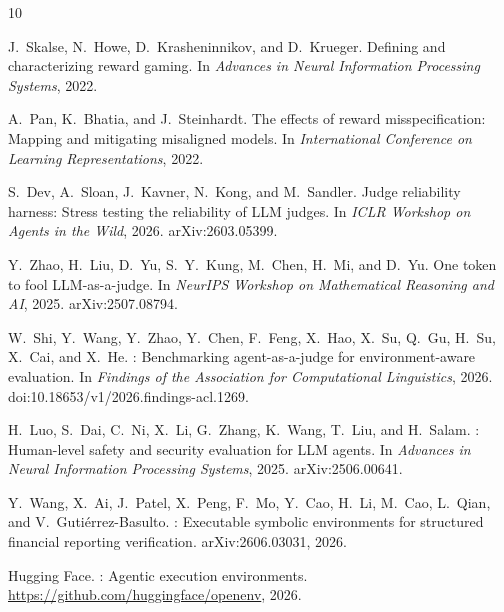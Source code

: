 \documentclass{article}
\begin{document}
{\small
\begin{thebibliography}{10}

J.~Skalse, N.~Howe, D.~Krasheninnikov, and D.~Krueger.
\newblock Defining and characterizing reward gaming.
\newblock In \emph{Advances in Neural Information Processing Systems}, 2022.

A.~Pan, K.~Bhatia, and J.~Steinhardt.
\newblock The effects of reward misspecification: Mapping and mitigating misaligned models.
\newblock In \emph{International Conference on Learning Representations}, 2022.

S.~Dev, A.~Sloan, J.~Kavner, N.~Kong, and M.~Sandler.
\newblock Judge reliability harness: Stress testing the reliability of {LLM} judges.
\newblock In \emph{{ICLR} Workshop on Agents in the Wild}, 2026.
\newblock arXiv:2603.05399.

Y.~Zhao, H.~Liu, D.~Yu, S.~Y.~Kung, M.~Chen, H.~Mi, and D.~Yu.
\newblock One token to fool {LLM}-as-a-judge.
\newblock In \emph{{NeurIPS} Workshop on Mathematical Reasoning and {AI}}, 2025.
\newblock arXiv:2507.08794.

W.~Shi, Y.~Wang, Y.~Zhao, Y.~Chen, F.~Feng, X.~Hao, X.~Su, Q.~Gu, H.~Su, X.~Cai, and X.~He.
: Benchmarking agent-as-a-judge for environment-aware evaluation.
\newblock In \emph{Findings of the Association for Computational Linguistics}, 2026.
\newblock doi:10.18653/v1/2026.findings-acl.1269.

H.~Luo, S.~Dai, C.~Ni, X.~Li, G.~Zhang, K.~Wang, T.~Liu, and H.~Salam.
: Human-level safety and security evaluation for {LLM} agents.
\newblock In \emph{Advances in Neural Information Processing Systems}, 2025.
\newblock arXiv:2506.00641.

Y.~Wang, X.~Ai, J.~Patel, X.~Peng, F.~Mo, Y.~Cao, H.~Li, M.~Cao, L.~Qian, and V.~Guti\'{e}rrez-Basulto.
: Executable symbolic environments for structured financial reporting verification.
\newblock arXiv:2606.03031, 2026.

Hugging Face.
: Agentic execution environments.
\newblock \url{https://github.com/huggingface/openenv}, 2026.

\end{thebibliography}
}
\end{document}
